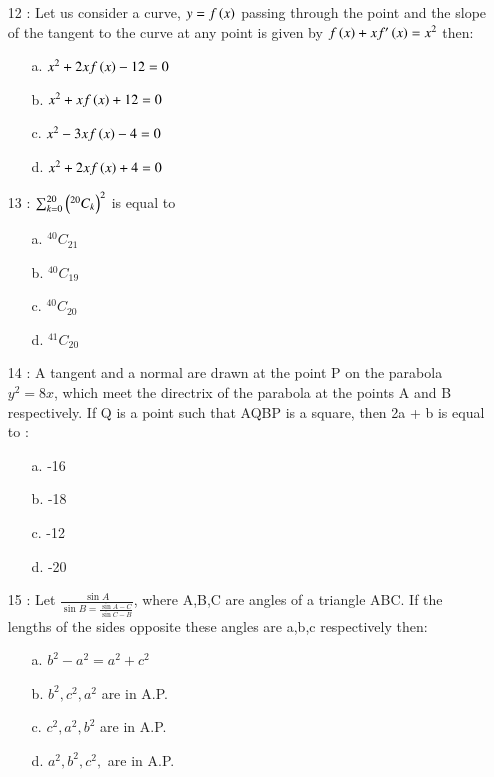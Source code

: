 \documentclass[journal]{IEEEtran}
\begin{document}
\begin{enumerate}
\item[12]: Let us consider a curve, $y = f\left(x\right)$ passing through the point  and the slope of the tangent to the curve at any point  is given by $f\left(x\right)+xf'\left(x\right)=x^2$ then:
\begin{enumerate}
     \item [a.] $x^2+2xf\left(x\right)-12=0$
    \item [b.] $x^2+xf\left(x\right)+12=0$
    \item [c.] $x^2-3xf\left(x\right)-4=0$
    \item [d.] $x^2+2xf\left(x\right)+4=0$
\end{enumerate}
\item[13]: $\sum_{k=0}^{20} \left(^{20}C_k\right)^2$ is equal to
\begin{enumerate}
     \item [a.] $^{40}C_{21}$
    \item [b.] $^{40}C_{19}$
    \item [c.] $^{40}C_{20}$
    \item [d.] $^{41}C_{20}$
\end{enumerate}
\item[14]: A tangent and a normal are drawn at the point
P on the parabola $y^2 = 8x$, which meet the
directrix of the parabola at the points A and B
respectively. If Q is a point such that AQBP
is a square, then 2a + b is equal to :
\begin{enumerate}
\item [a.] -16
    \item [b.]-18
    \item [c.] -12
    \item [d.] -20
\end{enumerate}
\item[15] : Let $\frac{\sin{A}}{\sin{B}=\frac{\sin{A-C}}{\sin{C-B}}}$, where A,B,C are angles of a triangle ABC. If the lengths of the sides opposite these angles are a,b,c respectively then:
\begin{enumerate}
\item [a.] $b^2-a^2=a^2+c^2$
    \item [b.]$b^2,c^2,a^2$ are in A.P.
    \item [c.] $c^2,a^2,b^2$ are in A.P.
    \item [d.] $a^2,b^2,c^2,$ are in A.P.
\end{enumerate}
\end{enumerate}
\end{document}
